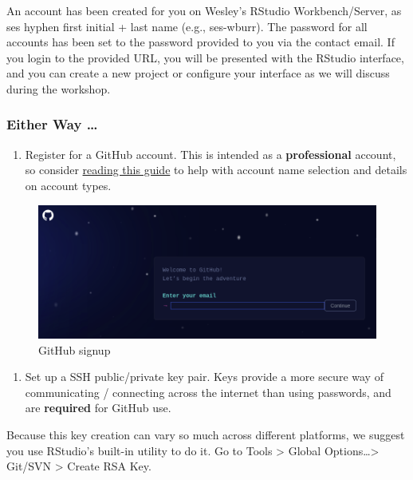 \documentclass[
]{article}
\providecommand{\tightlist}{%
  \setlength{\itemsep}{0pt}\setlength{\parskip}{0pt}}
\begin{document}
An account has been created for you on Wesley's RStudio
Workbench/Server, as ses hyphen first initial + last name (e.g.,
ses-wburr). The password for all accounts has been set to the password
provided to you via the contact email. If you login to the provided URL,
you will be presented with the RStudio interface, and you can create a
new project or configure your interface as we will discuss during the
workshop.

\hypertarget{either-way}{%
\subsubsection{Either Way \ldots{}}\label{either-way}}

\begin{enumerate}
\def\labelenumi{\arabic{enumi}.}
\setcounter{enumi}{3}
\tightlist
\item
  Register for a GitHub account. This is intended as a
  \textbf{professional} account, so consider
  \href{https://happygitwithr.com/github-acct.html}{reading this guide}
  to help with account name selection and details on account types.
\end{enumerate}

\begin{figure}
\centering
\includegraphics{img/github_signup.png?raw=true}
\caption{GitHub signup}
\end{figure}

\begin{enumerate}
\def\labelenumi{\arabic{enumi}.}
\setcounter{enumi}{4}
\tightlist
\item
  Set up a SSH public/private key pair. Keys provide a more secure way
  of communicating / connecting across the internet than using
  passwords, and are \textbf{required} for GitHub use.
\end{enumerate}

Because this key creation can vary so much across different platforms,
we suggest you use RStudio's built-in utility to do it. Go to Tools
\textgreater{} Global Options\ldots\textgreater{} Git/SVN \textgreater{}
Create RSA Key.
\end{document}

